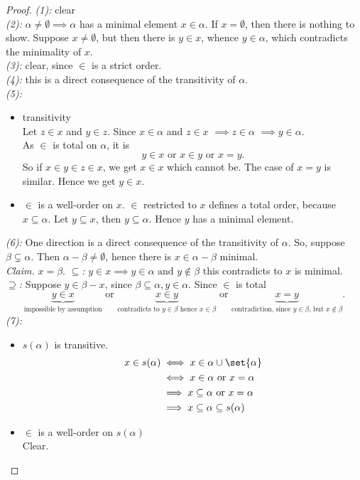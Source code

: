 \begin{proof}
    \emph{(1):} clear\\
    \emph{(2):} $\alpha \ne \emptyset \implies \alpha$ has a minimal element $x \in \alpha$.
    If $x = \emptyset$, then there is nothing to show. Suppose $x \ne \emptyset$, but then there is $y \in x$, whence
    $ y\in \alpha$, which contradicts the minimality of $x$.\\
    \emph{(3):} clear, since $\in$ is a strict order.\\
    \emph{(4):} this is a direct consequence of the transitivity of $\alpha$.\\
    \emph{(5):}
    \begin{itemize}[label=-]
        \item transitivity\\
        Let $z \in x$ and $y \in z$. Since $x \in \alpha$ and $z \in x$ $\implies z \in \alpha$ $\implies y \in \alpha$.\\
        As $\in$ is total on $\alpha$, it is
        $$ y \in x \text{ or } x \in y \text{ or } x=y. $$
        So if $x \in y \in z \in x$, we get $ x \in x$ which cannot be. The case of $x = y$ is similar. Hence we get $y \in x$.

        \item $\in$ is a well-order on $x$.
        $\in$ restricted to $x$ defines a total order, because $x \subseteq \alpha$. Let $y \subseteq x$, then $y \subseteq \alpha$.
        Hence $y$ has a minimal element.
    \end{itemize}
    \emph{(6):} One direction is a direct consequence of the transitivity of $\alpha$. So, suppose $\beta \subsetneq \alpha$. 
    Then $\alpha - \beta \ne \emptyset$, hence there is $x \in \alpha - \beta$ minimal.\\
    \emph{Claim.} $x = \beta$.
    \emph{$\subseteq$:} $y \in x \implies y \in \alpha \text{ and } y \notin \beta$ this contradicts to $x$ is minimal.\\
    \emph{$\supseteq$:} Suppose $y \in \beta - x$, since $\beta \subseteq \alpha, y \in \alpha$. Since $\in$ is total
    $$ \underbrace{y \in x}_{\text{impossible by assumption}} \text{ or } \underbrace{x \in y}_{\text{contradicts to $y \in \beta$ hence $x \in \beta$}} \text{ or } \underbrace{x = y}_{\text{contradiction, since $y \in \beta$, but $x \notin \beta$}}.$$
    \emph{(7):} 
    \begin{itemize}[label=-]
        \item $s(\alpha)$ is transitive.
        \begin{align*}
            x \in s(\alpha) & \iff x \in \alpha \cup \set{\alpha}\\
                & \iff x \in \alpha \text{ or } x = \alpha\\
                & \implies x \subseteq \alpha \text{ or } x = \alpha\\
                & \implies x \subseteq \alpha \subseteq s(\alpha)
        \end{align*}
        \item $\in$ is a well-order on $s(\alpha)$\\
        Clear.
    \end{itemize}
\end{proof}

